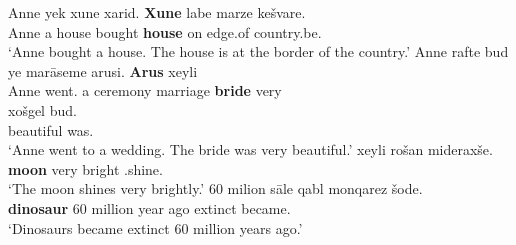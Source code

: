 \documentclass[output=paper]{langsci/langscibook}
\begin{document}
\begin{exe}
\ex\label{4ex:14}
	\begin{xlista}
	\ex\label{4ex:14a}
	\gll	Anne  	yek xune    	xarid.      {\bf{Xune}}    labe  	marze  		kešvare. \\
		Anne  	a     house  	bought   {\bf{house}}   on   	edge.of		country.be.{} \\
	\glt	`Anne bought a house. The house is at the border of the country.'
	\ex\label{4ex:14b}
	\gll	Anne rafte         	 	bud           		ye marāseme arusi.		{\bf{Arus}}		xeyli \\
	    	Anne went.{} 	{} 		a  ceremony  marriage 	{\bf{bride}} 	very  \\
	\glt
	\exi{}
	\gll	xošgel 		bud. \\
		beautiful	was.{} \\
 	\glt	`Anne went to a wedding. The bride was very beautiful.'
	\ex\label{4ex:14c}
	     	xeyli rošan   	mideraxše. \\
         	{\bf{moon}}  	very bright  	{}.shine.{} \\
         \glt	`The moon shines very brightly.'
	\ex\label{4ex:14d}
	 	60 milion  sāle qabl  	monqarez	šode. \\
		{\bf{dinosaur}}  	60 million year ago    	extinct		became.{} \\
   	\glt	`Dinosaurs became extinct 60 million years ago.'
	\end{xlista}
\end{exe}
\end{document}
